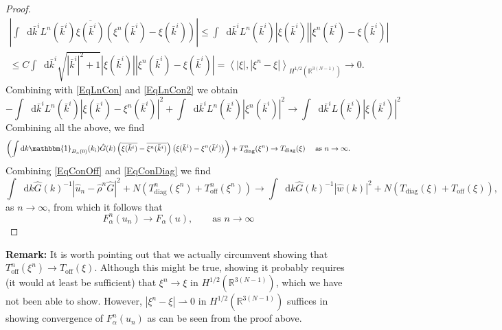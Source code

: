 \documentclass[a4paper,11pt]{article}
\newcommand{\abs}[1]{\left\lvert #1 \right\rvert}
\renewcommand{\braket}[1]{\left\langle#1\right\rangle}
\newcommand*\diff{\mathop{}\!\mathrm{d}}
\newcommand{\R}{\mathbb{R}}
\numberwithin{equation}{section}
\begin{document}
\begin{proof}
\begin{equation}
\begin{aligned}
\abs{\int\diff \bar{k}^i L^n(\bar{k}^i)\overline{\xi(\bar{k}^i)}(\xi^n(\bar{k}^i)-\xi(\bar{k}^i))}\leq\int\diff \bar{k}^i L^n(\bar{k}^i)\abs{\xi(\bar{k}^i)}\abs{\xi^n(\bar{k}^i)-\xi(\bar{k}^i)}\\\leq C\int\diff \bar{k}^i\sqrt{\abs{\bar{k}^i}^2+1}\abs{\xi(\bar{k}^i)}\abs{\xi^n(\bar{k}^i)-\xi(\bar{k}^i)}=\braket{\abs{\xi},\abs{\xi^n-\xi}}_{H^{1/2}(\R^{3(N-1)})}\to0.
\end{aligned}
\end{equation}
Combining with \eqref{EqLnCon} and \eqref{EqLnCon2} we obtain \begin{equation}
-\int\diff\bar{k}^iL^n(\bar{k}^i)\left\lvert\xi(\bar{k}^i)-\xi^n(\bar{k}^i)\right\rvert^2+\int\diff \bar{k}^i L^n(\bar{k}^i)\abs{\xi^n(\bar{k}^i)}^2\to\int\diff \bar{k}^i L(\bar{k}^i)\abs{\xi(\bar{k}^i)}^2
\end{equation}
Combining all the above, we find \begin{equation}\label{EqConDiag}
\left(\int\diff k\mathbbm{1}_{B_n(0)}(k_i)\hat{G}(k)\left(\overline{\xi(\bar{k}^i)}-\overline{\xi^n(\bar{k}^i)}\right)\left(\xi(\bar{k}^i)-\xi^n(\bar{k}^i)\right)\right)+T_{\text{diag}}^n(\xi^n)\to T_{\text{diag}}(\xi)\quad\text{ as }n\to\infty.
\end{equation}
Combining \eqref{EqConOff} and \eqref{EqConDiag} we find \begin{equation}
\int\diff k \hat{G}(k)^{-1}\abs{\hat{u}_n-\hat{\rho}^n\hat{G}}^2+N(T_{\text{diag}}^n(\xi^n)+T_{\text{off}}^n(\xi^n))\to \int\diff k \hat{G}(k)^{-1}\abs{\hat{w}(k)}^2+N(T_{\text{diag}}(\xi)+T_{\text{off}}(\xi)),
\end{equation}
as $ n\to\infty $, from which it follows that \begin{equation}
F^n_\alpha(u_n)\to F_\alpha(u),\qquad\text{as }n\to\infty
\end{equation}
	\end{proof}
	\textbf{Remark:} It is worth pointing out that we actually circumvent showing that $ T^n_{\text{off}}(\xi^n)\to T_{\text{off}}(\xi) $. Although this might be true, showing it probably requires (it would at least be sufficient) that $ \xi^n\to\xi $ in $ H^{1/2}(\R^{3(N-1)}) $, which we have not been able to show. However, $ \abs{\xi^n-\xi}\rightharpoonup0 $ in $ H^{1/2}(\R^{3(N-1)}) $ suffices in showing convergence of $ F_\alpha^n(u_n) $ as can be seen from the proof above.\\
\end{document}
